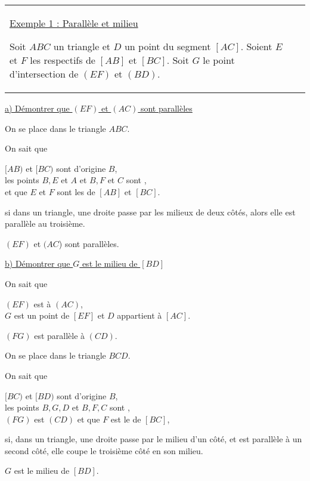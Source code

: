\begin{tabular}{M{9cm}M{9cm}}
\parbox{10cm}{
\underline{Exemple 1 : Parallèle et milieu}\\
\\
Soit $ABC$ un triangle et $D$ un point du segment $[AC]$. \\
Soient $E$ et $F$ les  respectifs de $[AB]$ et $[BC]$. \\
Soit $G$ le point d'intersection de $(EF)$ et $(BD)$.  
}
 &  
\end{tabular} 

\underline{a) Démontrer que $(EF)$ et $(AC)$ sont parallèles}

\medskip 

On se place dans le triangle $ABC$.

\begin{labeling}{On sait que } 
\item [On sait que ] $[AB)$ et $[BC)$ sont  d'origine $B$,\\
           les points $B, E$ et $A$ et $B, F$ et $C$ sont  , \\
            et que $E$ et $F$ sont les  de $[AB]$ et $[BC]$. 
\item [Or, ] si dans un triangle, une droite passe par les milieux  de deux côtés, alors elle est parallèle au troisième. 
\item [Donc] $(EF)$ et $(AC$) sont parallèles.             
\end{labeling}

\bigskip 

\underline{b) Démontrer que $G$ est le milieu de $[BD]$}

\begin{labeling}{On sait que } 
\item [On sait que ]  $(EF)$ est  à $(AC)$, \\
                      $G$ est un point de $[EF]$ et $D$ appartient à $[AC]$.\\
\item [Ainsi] $(FG)$ est parallèle à $(CD)$.            
\end{labeling}

On se place dans le triangle $BCD$.

\begin{labeling}{On sait que } 
\item [On sait que ] $[BC)$ et $[BD)$ sont  d'origine $B$,\\ 
           les points $B, G, D$ et $B, F, C$ sont  ,\\
$(FG)$ est  $(CD)$ et que $F$ est le  de $[BC]$, 
\item [Or, ] si, dans un triangle, une droite passe par le milieu d'un côté, 
   et est parallèle à un second côté, elle coupe le troisième côté en son milieu.
\item [Donc] $G$ est le milieu de $[BD]$. 
\end{labeling}

